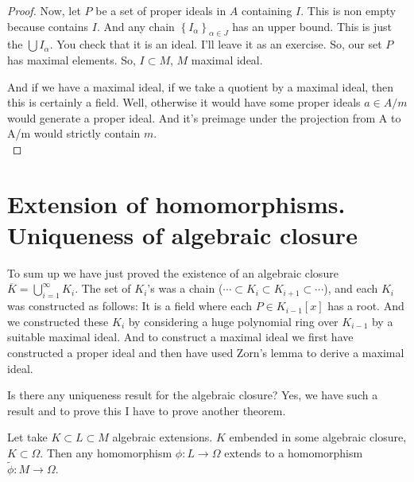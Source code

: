 \begin{proof}
Now, let $P$ be a set of proper ideals in $A$ containing $I$. This is non empty because contains $I$. 
And any chain $\left\{ I_{\alpha} \right\}_{\alpha\in J}$ has an upper bound. 
This is just the $\bigcup I_{\alpha}$. You check that it is an ideal. I'll leave it as an exercise. So, our set $P$ has maximal elements. So, $I \subset M$, $M$ maximal ideal. 

And if we have a maximal ideal, if we take a quotient by a maximal ideal, then this is certainly a field. Well, otherwise it would have some proper ideals $a \in A/m$ would generate a proper ideal. And it's preimage under the projection from A to A/m would strictly contain $m$.\\
\end{proof}


\section{Extension of homomorphisms. Uniqueness of algebraic closure}
To sum up we have just proved the existence of an algebraic closure $\overbar{K}=\bigcup_{i=1}^{\infty}K_i$. The set of $K_i$'s was a chain ($\cdots\subset K_i\subset K_{i+1}\subset \cdots$), and each $K_i$ was constructed as follows: It is a field where each $P\in K_{i-1}[x]$ has a root. And we constructed these $K_i$ by considering a huge polynomial ring over $K_{i-1}$ by a suitable maximal ideal. And to construct a maximal ideal we first have constructed a proper ideal and then have used Zorn's lemma to derive a maximal ideal. 

Is there any uniqueness result for the algebraic closure? Yes, we have such a result and to prove this I have to prove another theorem. 

\begin{theorem}
Let take $K \subset L \subset M$ algebraic extensions. $K$ embended in some algebraic closure, $K\subset \Omega$. Then any homomorphism $\phi:L\to \Omega$ extends to a homomorphism $\widetilde{\phi}: M \to \Omega$.
\end{theorem}


